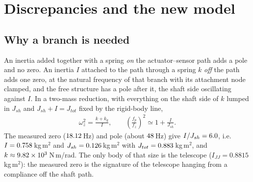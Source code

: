 \documentclass[10pt,a4paper]{article}
\numberwithin{equation}{section}
\begin{document}
\section{Discrepancies and the new model}\label{sec:newmodel}
\subsection{Why a branch is needed}\label{subsec:branch}
An inertia added together with a spring \emph{on} the actuator--sensor path adds a pole and no zero. An inertia $I$ attached to the path through a spring $k$ \emph{off} the path adds one zero, at the natural frequency of that branch with its attachment node clamped, and the free structure has a pole after it, the shaft side oscillating against $I$. In a two-mass reduction, with everything on the shaft side of $k$ lumped in $J_{sh}$ and $J_{sh} + I = J_{tot}$ fixed by the rigid-body line,
\begin{gather}
\omega_z^2 = \frac{k + k_g}{I},\qquad \left(\frac{f_p}{f_z}\right)^2 \simeq 1 + \frac{I}{J_{sh}}.\label{eq:twomass}
\end{gather}
The measured zero ($18.12$\,Hz) and pole (about $48$\,Hz) give $I/J_{sh} = 6.0$, i.e.\ $I = 0.758$\,kg\,m$^2$ and $J_{sh} = 0.126$\,kg\,m$^2$ with $J_{tot} = 0.883$\,kg\,m$^2$, and $k \approx 9.82\times10^{3}$\,N\,m/rad. The only body of that size is the telescope ($I_{JJ} = 0.8815$\,kg\,m$^2$): the measured zero is the signature of the telescope hanging from a compliance off the shaft path.
\end{document}

